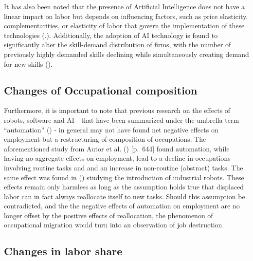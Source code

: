 \documentclass[
  11,
  a4paperpaper,
]{article}
\begin{document}
It has also been noted that the presence of Artificial Intelligence does
not have a linear impact on labor but depends on influencing factors,
such as price elasticity, complementarities, or elasticity of labor that
govern the implementation of these technologies
(.). Additionally, the adoption of AI technology is found to
significantly alter the skill-demand distribution of firms, with the
number of previously highly demanded skills declining while
simultaneously creating demand for new skills
().

\subsection{Changes of Occupational
composition}\label{sec-changes-of-occupational-composition}

Furthermore, it is important to note that previous research on the
effects of robots, software and AI - that have been summarized under the
umbrella term ``automation'' () - in general may not have found net negative
effects on employment but a restructuring of composition of occupations.
The aforementioned study from Autor et al.
() {[}p.~644{]} found
automation, while having no aggregate effects on employment, lead to a
decline in occupations involving routine tasks and and an increase in
non-routine (abstract) tasks. The same effect was found in
()
studying the introduction of industrial robots. These effects remain
only harmless as long as the assumption holds true that displaced labor
can in fact always reallocate itself to new tasks. Should this
assumption be contradicted, and the the negative effects of automation
on employment are no longer offset by the positive effects of
reallocation, the phenomenon of occupational migration would turn into
an observation of job destruction.

\subsection{Changes in labor share}\label{changes-in-labor-share}
\end{document}
